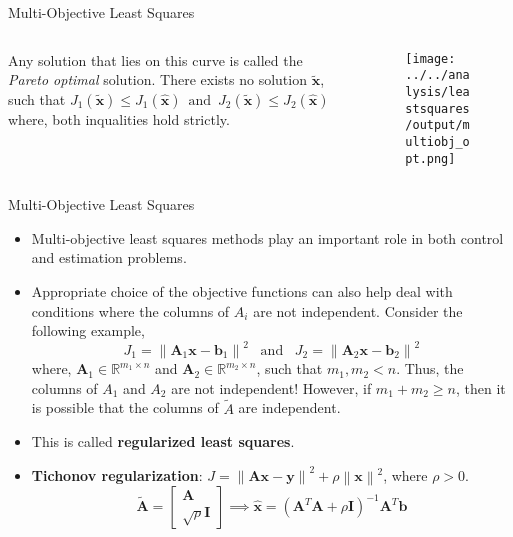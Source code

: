 \documentclass[aspectratio=169]{beamer}
\begin{document}
\begin{frame}[t]{Multi-Objective Least Squares}
    \begin{columns}
        \begin{column}{0.3\textwidth}
        {\small Any solution that lies on this curve is called the \textit{Pareto optimal} solution. There exists no solution $\tilde{\mathbf{x}}$, such that $J_1\left(\tilde{\mathbf{x}}\right) \leq J_1\left(\hat{\mathbf{x}}\right) \,\,\, \text{and} \,\,\, J_2\left(\tilde{\mathbf{x}}\right) \leq J_2\left(\hat{\mathbf{x}}\right)$ where, both inqualities hold strictly.}
        \end{column}
        
        \begin{column}{0.65\textwidth}
        \begin{figure}
            \centering
            \texttt{[image: ../../analysis/leastsquares/output/multiobj\_opt.png]}
        \end{figure}
    \end{column}
    \end{columns}
\end{frame}


\begin{frame}[t]{Multi-Objective Least Squares}
\begin{small}
\begin{itemize}
    \item Multi-objective least squares methods play an important role in both control and estimation problems.
    
    \item Appropriate choice of the objective functions can also help deal with conditions where the columns of $A_i$ are not independent. Consider the following example,
    \[ J_1 = \left\lVert \mathbf{A}_1\mathbf{x} - \mathbf{b}_1 \right\rVert^2 \,\,\, \text{ and } \,\,\, J_2 = \left\lVert \mathbf{A}_2\mathbf{x} - \mathbf{b}_2\right\rVert^2 \]
    where, $\mathbf{A}_1 \in \mathbb{R}^{m_1 \times n}$ and $\mathbf{A}_2 \in \mathbb{R}^{m_2 \times n}$, such that $m_1, m_2 < n$. Thus, the columns of $A_1$ and $A_2$ are not independent!
    However, if $m_1 + m_2 \geq n$, then it is possible that the columns of $\tilde{A}$ are independent.

    \item This is called \textbf{regularized least squares}.

    \item \textbf{Tichonov regularization}: $J = \left\lVert \mathbf{Ax} - \mathbf{y}\right\rVert^2 + \rho \left\lVert \mathbf{x} \right\rVert^2$, where $\rho > 0$.
    \[ \mathbf{\tilde{A}} = \begin{bmatrix*}\mathbf{A}\\\sqrt{\rho}\mathbf{I}\end{bmatrix*} \implies \hat{\mathbf{x}} =  \left(\mathbf{A}^T\mathbf{A} + \rho \mathbf{I}\right)^{-1}\mathbf{A}^T\mathbf{b} \]
\end{itemize}
\end{small}
\end{frame}
\end{document}
